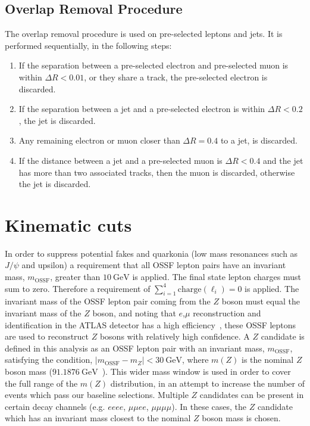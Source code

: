 \subsection{Overlap Removal Procedure}
\label{sec:overlap-removal-procedure}
The overlap removal procedure is used on pre-selected leptons and jets. It is performed sequentially, in the following steps:

\begin{enumerate}
\item If the separation between a pre-selected electron and pre-selected muon is within $\Delta R < 0.01$, or they share a track, the pre-selected electron is discarded.
\item If the separation between a jet and a pre-selected electron is within $\Delta R < 0.2$, the jet is discarded.
\item Any remaining electron or muon closer than $\Delta R = 0.4$ to a jet, is discarded.
\item If the distance between a jet and a pre-selected muon is $\Delta R < 0.4$ and the jet has more than two associated tracks, then the muon is discarded, otherwise the jet is discarded.
\end{enumerate}


\section{Kinematic cuts}

In order to suppress potential fakes and quarkonia (low mass resonances such as $J/\psi$ and upsilon) a requirement that all OSSF lepton pairs have an invariant mass, $m_{\text{OSSF}}$, greater than $\SI{10}{\GeV}$ is applied. The final state lepton charges must sum to zero. Therefore a requirement of $\displaystyle\sum_{i=1}^{4} \text{charge}(\ell_i) = 0$ is applied. The invariant mass of the OSSF lepton pair coming from the $Z$ boson must equal the invariant mass of the $Z$ boson, and noting that $e$,$\mu$ reconstruction and identification in the ATLAS detector has a high efficiency~\cite{Marchese:2688452}, these OSSF leptons are used to reconstruct $Z$ bosons with relatively high confidence. A $Z$ candidate is defined in this analysis as an OSSF lepton pair with an invariant mass, $m_{\text{OSSF}}$, satisfying the condition, $|m_{\text{OSSF}} - m_Z| <  \SI{30}{\GeV}$, where $m(Z)$ is the nominal $Z$ boson mass ($\SI{91.1876}{\GeV}$~\cite{pdg}). This wider mass window is used in order to cover the full range of the $m(Z)$ distribution, in an attempt to increase the number of events which pass our baseline selections. Multiple $Z$ candidates can be present in certain decay channels (e.g. $eeee$, $\mu\mu ee$, $\mu \mu \mu \mu$). In these cases, the $Z$ candidate which has an invariant mass closest to the nominal $Z$ boson mass is chosen. 





